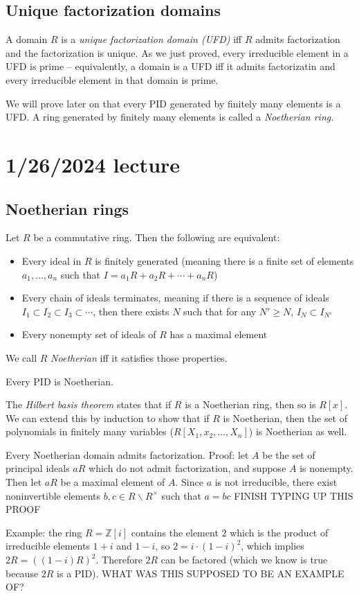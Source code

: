 \documentclass[12pt]{article}
\begin{document}
\subsection{Unique factorization domains}
A domain $R$ is a \textit{unique factorization domain (UFD)} iff $R$ admits factorization and the factorization is unique. As we just proved, every irreducible element in a UFD is prime -- equivalently, a domain is a UFD iff it admits factorizatin and every irreducible element in that domain is prime.
\par
We will prove later on that every PID generated by finitely many elements is a UFD. A ring generated by finitely many elements is called a \textit{Noetherian ring}.

\section{1/26/2024 lecture}
\subsection{Noetherian rings}
Let $R$ be a commutative ring. Then the following are equivalent:
\begin{itemize}
    \item Every ideal in $R$ is finitely generated (meaning there is a finite set of elements $a_1, \dots, a_n$ such that $I=a_1R+a_2R+ \cdots +a_nR$)
    \item Every chain of ideals terminates, meaning if there is a sequence of ideals $I_1 \subset I_2 \subset I_3 \subset \cdots$, then there exists $N$ such that for any $N' \geq N$, $I_N \subset I_{N'}$
    \item Every nonempty set of ideals of $R$ has a maximal element
\end{itemize}
We call $R$ \textit{Noetherian} iff it satisfies those properties.
\par
Every PID is Noetherian.
\par
The \textit{Hilbert basis theorem} states that if $R$ is a Noetherian ring, then so is $R[x]$. We can extend this by induction to show that if $R$ is Noetherian, then the set of polynomials in finitely many variables ($R[X_1, x_2, \dots, X_n]$) is Noetherian as well.
\par
Every Noetherian domain admits factorization. Proof: let $A$ be the set of principal ideals $aR$ which do not admit factorization, and suppose $A$ is nonempty. Then let $aR$ be a maximal element of $A$. Since $a$ is not irreducible, there exist noninvertible elements $b,c \in R \backslash R^\times$ such that $a=bc$ FINISH TYPING UP THIS PROOF
\par
Example: the ring $R=\mathbb{Z}[i]$ contains the element $2$ which is the product of irreducible elements $1+i$ and $1-i$, so $2=i \cdot (1-i)^2$, which implies $2R = \left( (1-i)R \right)^2$. Therefore $2R$ can be factored (which we know is true because $2R$ is a PID). WHAT WAS THIS SUPPOSED TO BE AN EXAMPLE OF?
\end{document}
